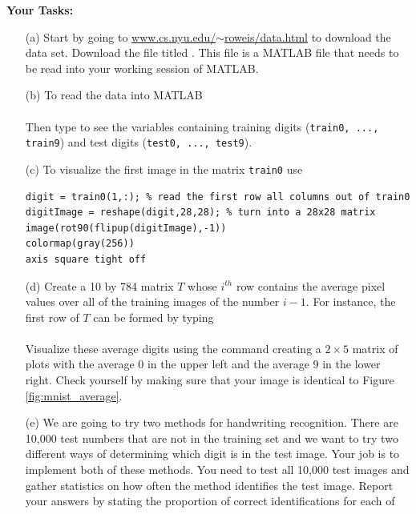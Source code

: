 \begin{problem}
    {\bf Your Tasks:}
    \begin{enumerate}
        \item[(a)] Start by going to
            \href{http://www.cs.nyu.edu/~roweis/data.html}{www.cs.nyu.edu/$\sim$roweis/data.html}
            to download the data set.  Download the file titled .
            This file is a MATLAB file that needs to be read into your working session of
            MATLAB.  
        \item[(b)] To read the  data into MATLAB \\
            \\
            Then type  to see the variables containing training digits
            (\texttt{train0, ..., train9}) and test digits (\texttt{test0, ...,
            test9}).
        \item[(c)] To visualize the first image in the matrix \texttt{train0} use 
\begin{lstlisting}
digit = train0(1,:); % read the first row all columns out of train0
digitImage = reshape(digit,28,28); % turn into a 28x28 matrix
image(rot90(flipup(digitImage),-1))
colormap(gray(256))
axis square tight off
\end{lstlisting}
        \item[(d)] Create a 10 by 784 matrix $T$ whose $i^{th}$ row contains the average
            pixel values over all of the training images of the number $i-1$.  For
            instance, the first row of $T$ can be formed by typing \\
             \\
            Visualize these average digits using the  command creating a
            $2 \times 5$ matrix of plots with the average 0 in the upper left and the
            average 9 in the lower right.  Check yourself by making sure that your image
            is identical to Figure \ref{fig:mnist_average}.
        \item[(e)] We are going to try two methods for handwriting recognition.  There are
            10,000 test numbers that are not in the training set and we want to try two
            different ways of determining which digit is in the test image.  Your job is
            to implement both of these methods.  You need to test all 10,000 test images and
            gather statistics on how often the method identifies the test image.  Report
            your answers by stating the proportion of correct identifications for each of

\end{enumerate}
\end{problem}
